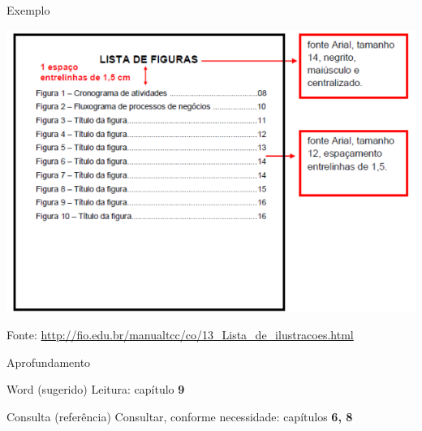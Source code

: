 \documentclass{beamer}
\begin{document}
\begin{frame}{Exemplo}
  \begin{center}
    \includegraphics[height=0.8\textheight]{ProjetoII/lista_figuras}
  \end{center}

  Fonte: \url{http://fio.edu.br/manualtcc/co/13_Lista_de_ilustracoes.html}
\end{frame}

\begin{frame}{Aprofundamento}
  \begin{block}{Word (sugerido)}
    Leitura: capítulo {\bf 9}
  \end{block}
  \begin{block}{Consulta (referência)}
    Consultar, conforme necessidade: capítulos {\bf 6, 8}
  \end{block}
\end{frame}


\end{document}
